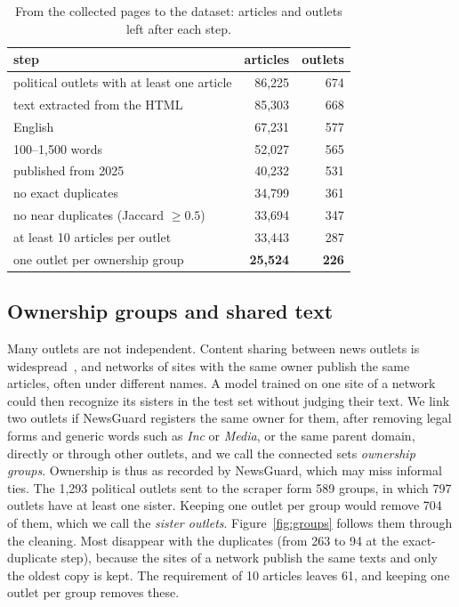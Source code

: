 \documentclass[11pt,a4paper]{article}
\begin{document}
\begin{table}[t]
\centering
\caption{From the collected pages to the dataset: articles and outlets left after each step.}\label{tab:cleaning}
\begin{tabular}{lrr}
\toprule
step & articles & outlets \\
\midrule
political outlets with at least one article & 86,225 & 674 \\
text extracted from the HTML & 85,303 & 668 \\
English & 67,231 & 577 \\
100--1,500 words & 52,027 & 565 \\
published from 2025 & 40,232 & 531 \\
no exact duplicates & 34,799 & 361 \\
no near duplicates (Jaccard $\geq 0.5$) & 33,694 & 347 \\
at least 10 articles per outlet & 33,443 & 287 \\
one outlet per ownership group & \textbf{25,524} & \textbf{226} \\
\bottomrule
\end{tabular}
\end{table}

\subsection{Ownership groups and shared text}\label{sec:groups}
Many outlets are not independent. Content sharing between news outlets is widespread~\cite{horne2019spirals}, and
networks of sites with the same owner publish the same articles, often under different names. A model trained on one
site of a network could then recognize its sisters in the test set without judging their text. We link two outlets if
NewsGuard registers the same owner for them, after removing legal forms and generic words such as \emph{Inc} or
\emph{Media}, or the same parent domain, directly or through other outlets, and we call the connected sets
\emph{ownership groups}. Ownership is thus as recorded by NewsGuard, which may miss informal ties. The 1,293 political
outlets sent to the scraper form 589 groups, in which 797 outlets have at least one sister. Keeping one outlet per group
would remove 704 of them, which we call the \emph{sister outlets}. Figure~\ref{fig:groups} follows them through the
cleaning. Most disappear with the duplicates (from 263 to 94 at the exact-duplicate step), because the sites of a network
publish the same texts and only the oldest copy is kept. The requirement of 10 articles leaves 61, and keeping one outlet
per group removes these.
\end{document}
